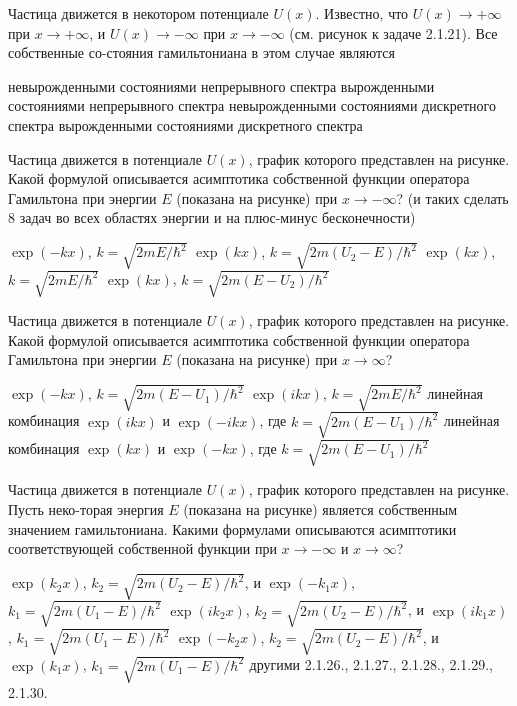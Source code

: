 \documentclass[11pt,a4paper]{exam}
\begin{document}
\begin{questions}
\question Частица движется в некотором потенциале $U(x)$. Известно, что $U(x) \to  + \infty $ при $x \to  + \infty $, и $U(x) \to  - \infty $ при $x \to  - \infty $ (см. рисунок к задаче 2.1.21). Все собственные со-стояния гамильтониана в этом случае являются 
\begin{choices}
\choice невырожденными состояниями непрерывного спектра       
\choice вырожденными состояниями непрерывного спектра
\choice невырожденными состояниями дискретного спектра        
\choice вырожденными состояниями дискретного спектра
\end{choices}

\question Частица движется в потенциале $U(x)$, график которого представлен на рисунке. Какой формулой описывается асимптотика собственной функции оператора Гамильтона при энергии $E$ (показана на рисунке) при $x \to  - \infty $?
(и таких сделать 8 задач во всех областях энергии и на плюс-минус бесконечности)
\begin{choices}
\choice $\exp ( - kx)$, $k = \sqrt {2mE/{\hbar ^2}} $      
\choice $\exp (kx)$, $k = \sqrt {2m({U_2} - E)/{\hbar ^2}} $
\choice $\exp (kx)$, $k = \sqrt {2mE/{\hbar ^2}} $      
\choice $\exp (kx)$, $k = \sqrt {2m(E - {U_2})/{\hbar ^2}} $
\end{choices}

\question Частица движется в потенциале $U(x)$, график которого представлен на рисунке. Какой формулой описывается асимптотика собственной функции оператора Гамильтона при энергии $E$ (показана на рисунке) при $x \to \infty $?
\begin{choices}
\choice $\exp ( - kx)$, $k = \sqrt {2m(E - {U_1})/{\hbar ^2}} $     
\choice $\exp (ikx)$, $k = \sqrt {2mE/{\hbar ^2}} $ 
\choice линейная комбинация $\exp (ikx)$ и $\exp ( - ikx)$, где $k = \sqrt {2m(E - {U_1})/{\hbar ^2}} $
\choice линейная комбинация $\exp (kx)$ и $\exp ( - kx)$, где $k = \sqrt {2m(E - {U_1})/{\hbar ^2}} $
\end{choices}

\question Частица движется в потенциале $U(x)$, график которого представлен на рисунке. Пусть неко-торая энергия $E$ (показана на рисунке) является собственным значением гамильтониана. Какими формулами описываются асимптотики соответствующей собственной функции при $x \to  - \infty $ и $x \to \infty $?
\begin{choices}
\choice $\exp ({k_2}x)$, ${k_2} = \sqrt {2m({U_2} - E)/{\hbar ^2}} $, и $\exp ( - {k_1}x)$, ${k_1} = \sqrt {2m({U_1} - E)/{\hbar ^2}} $
\choice $\exp (i{k_2}x)$, ${k_2} = \sqrt {2m({U_2} - E)/{\hbar ^2}} $, и $\exp (i{k_1}x)$, ${k_1} = \sqrt {2m({U_1} - E)/{\hbar ^2}} $ 
\choice $\exp ( - {k_2}x)$, ${k_2} = \sqrt {2m({U_2} - E)/{\hbar ^2}} $, и $\exp ({k_1}x)$, ${k_1} = \sqrt {2m({U_1} - E)/{\hbar ^2}} $
\choice другими
2.1.26., 2.1.27., 2.1.28., 2.1.29., 2.1.30.
\end{choices}


\end{questions}
\end{document}
